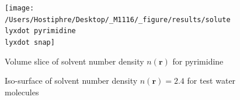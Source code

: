 \begin{figure}[H]
\begin{centering}
\texttt{[image: /Users/Hostiphre/Desktop/\_M1116/\_figure/results/solute\\lyxdot pyrimidine\\lyxdot snap]}
\par\end{centering}
\caption{Volume slice of solvent number density $n(\mathbf{r})$ for pyrimidine\label{fig:Volume-slice-of}}
\end{figure}

\begin{figure}[H]

\caption{Iso-surface of solvent number density $n(\mathbf{r})=2.4$ for test
water molecules\label{fig:Iso-surface-of-solvent}}
\end{figure}

\newpage{}

$ $
